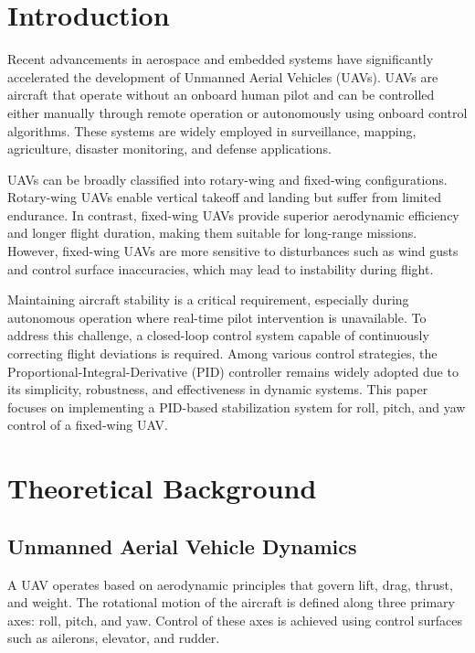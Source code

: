 \documentclass[conference]{IEEEtran}
\begin{document}
\section{Introduction}
Recent advancements in aerospace and embedded systems have significantly accelerated the development of Unmanned Aerial Vehicles (UAVs). UAVs are aircraft that operate without an onboard human pilot and can be controlled either manually through remote operation or autonomously using onboard control algorithms. These systems are widely employed in surveillance, mapping, agriculture, disaster monitoring, and defense applications.

UAVs can be broadly classified into rotary-wing and fixed-wing configurations. Rotary-wing UAVs enable vertical takeoff and landing but suffer from limited endurance. In contrast, fixed-wing UAVs provide superior aerodynamic efficiency and longer flight duration, making them suitable for long-range missions. However, fixed-wing UAVs are more sensitive to disturbances such as wind gusts and control surface inaccuracies, which may lead to instability during flight.

Maintaining aircraft stability is a critical requirement, especially during autonomous operation where real-time pilot intervention is unavailable. To address this challenge, a closed-loop control system capable of continuously correcting flight deviations is required. Among various control strategies, the Proportional-Integral-Derivative (PID) controller remains widely adopted due to its simplicity, robustness, and effectiveness in dynamic systems. This paper focuses on implementing a PID-based stabilization system for roll, pitch, and yaw control of a fixed-wing UAV.

\section{Theoretical Background}

\subsection{Unmanned Aerial Vehicle Dynamics}
A UAV operates based on aerodynamic principles that govern lift, drag, thrust, and weight. The rotational motion of the aircraft is defined along three primary axes: roll, pitch, and yaw. Control of these axes is achieved using control surfaces such as ailerons, elevator, and rudder.
\end{document}
